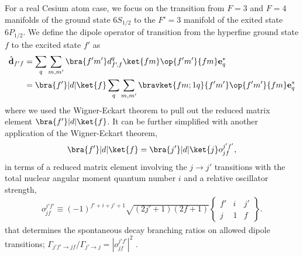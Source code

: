 For a real Cesium atom case, we focus on the transition from $ F=3 $ and $ F=4 $ manifolds of the ground state $ 6S_{1/2} $ to the $ F'=3 $ manifold of the exited state $ 6P_{1/2} $. We define the dipole operator of transition from the hyperfine ground state $ f $ to the excited state $ f' $ as~\cite{Baragiola2014a}
\begin{align}
\hat{\mathbf{d}}_{f'f} &=  \sum_q \sum_{m, m'}  \bra{f' m'} d_{f'\!,f}^q \ket{f m} \op{f' m'}{f m} \mathbf{e}_q^* \\
& = \bra{ f' }| d | \ket{ f } \sum_q \sum_{m, m'}  \bravket{f m; 1 q}{f' m'} \op{f' m'}{f m} \mathbf{e}_q^*
\end{align}
where we used the Wigner-Eckart theorem to pull out the reduced matrix element $\bra{ f' }| d | \ket{ f } $.  It can be further simplified with another application of the Wigner-Eckart theorem,
	\begin{align}
		\bra{ f' }| d | \ket{ f } = \bra{ j' }| d | \ket{ j } o^{j' f'}_{j f},
	\end{align}
in terms of a reduced matrix element involving the $j \rightarrow j'$ transitions with the total nuclear angular moment quantum number $ i $ and a relative oscillator strength,
	\begin{align} \label{Eq::OscStrength}
		o^{j' f'}_{j f} \equiv (-1)^{f'+i + j' + 1} \sqrt{ (2 j'+1) (2f + 1) } 
			\left\{ 
				\begin{array}{ccc}
					f' & i & j' \\
					j & 1 & f
				\end{array}
			\right\} .
	\end{align}
that determines the spontaneous decay branching ratios on allowed dipole transitions; $\Gamma_{j' f' \rightarrow j f} / \Gamma_{j'\rightarrow j} = |o^{j' f'}_{j f}|^2$ \cite{Deutsch2010a}.	
	
